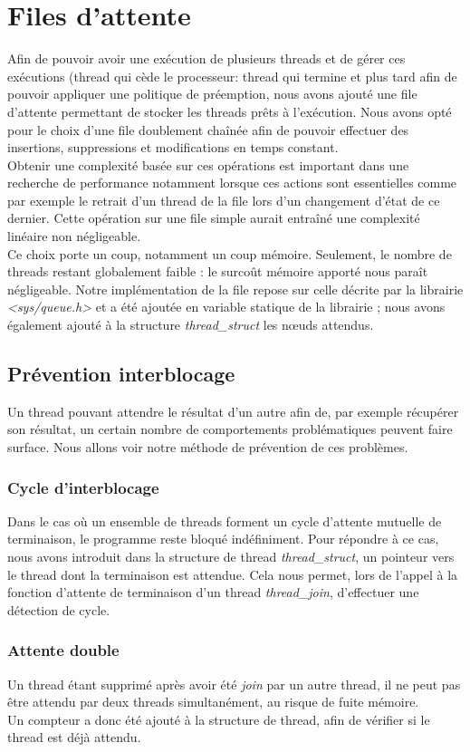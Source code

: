 \section{Files d’attente}
\label{sec:files_dattente}
Afin de pouvoir avoir une exécution de plusieurs threads et de gérer ces exécutions (thread qui cède le processeur: thread qui termine et plus tard afin de pouvoir appliquer une politique de préemption, 
nous avons ajouté une file d'attente permettant de stocker les threads prêts à l'exécution. Nous avons opté pour le choix d'une file doublement chaînée afin de pouvoir effectuer 
des insertions, suppressions et modifications en temps constant. \\
Obtenir une complexité basée sur ces opérations est important dans une recherche de performance notamment lorsque ces actions sont essentielles
comme par exemple le retrait d'un thread de la file
lors d'un changement d'état de ce dernier. Cette opération sur une file simple aurait entraîné une complexité linéaire non négligeable.\\ 
Ce choix porte un coup, notamment un coup mémoire. Seulement, le nombre de threads restant globalement faible : le surcoût mémoire apporté nous paraît négligeable.
Notre implémentation de la file repose sur celle décrite par la librairie \textit{<sys/queue.h>}\cite{queue_lib} et a été ajoutée en variable statique de la librairie ; nous avons également ajouté à la structure \textit{thread\_struct} les nœuds attendus.



\subsection{Prévention interblocage}
Un thread pouvant attendre le résultat d'un autre afin de, par exemple récupérer son résultat, un certain nombre de comportements
problématiques peuvent faire surface. Nous allons voir notre méthode de prévention de ces problèmes.

\subsubsection{Cycle d'interblocage}
Dans le cas où un ensemble de threads forment un cycle d'attente mutuelle de terminaison, le programme reste bloqué indéfiniment.
Pour répondre à ce cas, nous avons introduit dans la structure de thread \textit{thread\_struct}, un pointeur vers le thread dont la terminaison est attendue.
Cela nous permet, lors de l'appel à la fonction d'attente de terminaison d'un thread \textit{thread\_join}, d'effectuer une détection de cycle.

\subsubsection{Attente double}
Un thread étant supprimé après avoir été \textit{join} par un autre thread, il ne peut pas être attendu par deux threads simultanément, au risque de fuite mémoire.\\ 
Un compteur a donc été ajouté à la structure de thread, afin de vérifier si le thread est déjà attendu.
